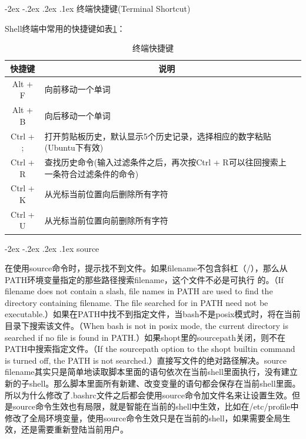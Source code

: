 \documentclass[12pt]{book}
\makeatletter
\numberwithin{dummy}{section}
\theoremstyle{ocrenumbox}
\theoremstyle{blacknumex}
\theoremstyle{blacknumbox}
\theoremstyle{ocrenum}
\renewcommand\paragraph{\@startsection{paragraph}{4}{\z@}
	{-2ex \@plus-.2ex \@minus .2ex}
	{.1ex}
	{\normalfont\small\sffamily\bfseries}}
\makeatother
\begin{document}
\paragraph{终端快捷键(Terminal Shortcut)}

Shell终端中常用的快捷键如表\ref{table:terminalshortcut}：

\begin{table}
	\caption{终端快捷键}
	\label{table:terminalshortcut}
	\begin{center}
	\begin{tabular}{cp{12cm}c}
		\hline
		\multirow{1}{*}{快捷键}
		& \multicolumn{1}{c}{说明}  \\
		\hline			
		Alt + F & 向前移动一个单词 \\
		Alt + B & 向后移动一个单词 \\
		Ctrl + ; & 打开剪贴板历史，默认显示5个历史记录，选择相应的数字粘贴(Ubuntu下有效) \\
		Ctrl + R & 查找历史命令(输入过滤条件之后，再次按Ctrl + R可以往回搜索上一条符合过滤条件的命令)\\
		Ctrl + K & 从光标当前位置向后删除所有字符\\
		Ctrl + U & 从光标当前位置向前删除所有字符\\
		\hline
	\end{tabular}
	\end{center}
\end{table}

\paragraph{source}

在使用source命令时，提示找不到文件。如果filename不包含斜杠（/），那么从PATH环境变量指定的那些路径搜索filename，这个文件不必是可执行 的。（If filename does not contain a slash, file names in  PATH  are used  to  find the directory containing filename.  The file searched for in PATH need not be executable.）如果在PATH中找不到指定文件，当bash不是posix模式时，将在当前目录下搜索该文件。（When bash is not in posix mode, the current directory is searched if no file is found in PATH.）如果shopt里的sourcepath关闭，则不在PATH中搜索指定文件。（If  the sourcepath  option  to  the shopt builtin command is turned off, the PATH is not searched.）直接写文件的绝对路径解决。source filename其实只是简单地读取脚本里面的语句依次在当前shell里面执行，没有建立新的子shell。那么脚本里面所有新建、改变变量的语句都会保存在当前shell里面。所以为什么修改了.bashrc文件之后都会使用source命令加文件名来让设置生效。但是source命令生效也有局限，就是智能在当前的shell中生效，比如在/etc/profile中修改了全局环境变量，使用source命令生效只是在当前的shell，如果需要全局生效，还是需要重新登陆当前用户。
\end{document}
